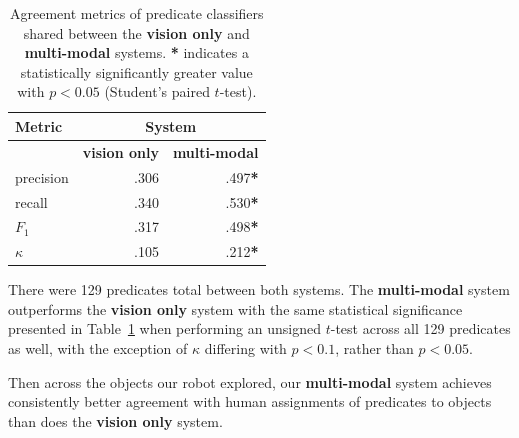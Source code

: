 \begin{table}
\centering
\begin{tabular}[h]{|l|r|r|}
	\hline
	\bf Metric & \multicolumn{2}{c|}{\bf System} \\ \hline \hline
	& \bf vision only & \bf multi-modal \\ \hline
	precision & .306 & .497\textbf{*} \\
	recall & .340 & .530\textbf{*} \\
	\bf $F_1$ & .317 & .498\textbf{*} \\
	\bf $\kappa$ & .105 & .212\textbf{*} \\ \hline
\end{tabular}
\caption{Agreement metrics of predicate classifiers shared between the \textbf{vision only} and \textbf{multi-modal} systems.
\textbf{*} indicates a statistically significantly greater value with $p<0.05$ (Student's paired $t$-test).}
\label{tab:predicate_results}
\end{table}

There were 129 predicates total between both systems.
The \textbf{multi-modal} system outperforms the \textbf{vision only} system with the same statistical significance presented in Table~\ref{tab:predicate_results} when performing an unsigned $t$-test across all 129 predicates as well, with the exception of $\kappa$ differing with $p<0.1$, rather than $p<0.05$.

Then across the objects our robot explored, our \textbf{multi-modal} system achieves consistently better agreement with human assignments of predicates to objects than does the \textbf{vision only} system.